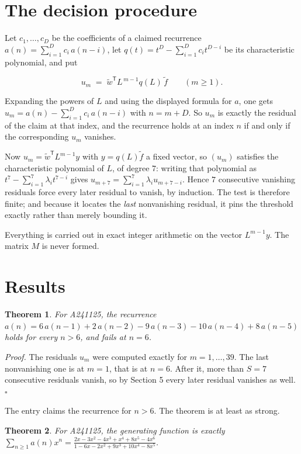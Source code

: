 \documentclass[11pt]{article}
\newtheorem{theorem}{Theorem}
\theoremstyle{definition}
\begin{document}
\section{The decision procedure}

Let $c_1,\dots,c_D$ be the coefficients of a claimed recurrence $a(n) = \sum_{i=1}^{D} c_i\,a(n-i)$, let $q(t) = t^{D} - \sum_{i=1}^{D} c_i t^{D-i}$ be its characteristic polynomial, and put

\[u_m \;=\; \tilde w^{\mathsf T} L^{\,m-1} q(L)\,\tilde f \qquad (m \ge 1).\]

Expanding the powers of $L$ and using the displayed formula for $a$, one gets $u_m = a(n) - \sum_{i=1}^{D} c_i\,a(n-i)$ with $n = m + D$. So $u_m$ is exactly the residual of the claim at that index, and the recurrence holds at an index $n$ if and only if the corresponding $u_m$ vanishes.

Now $u_m = \tilde w^{\mathsf T} L^{m-1} y$ with $y = q(L)\tilde f$ a fixed vector, so $(u_m)$ satisfies the characteristic polynomial of $L$, of degree $7$: writing that polynomial as $t^{7} - \sum_{i=1}^{7} \lambda_i t^{7-i}$ gives $u_{m+7} = \sum_{i=1}^{7} \lambda_i u_{m+7-i}$. Hence $7$ consecutive vanishing residuals force every later residual to vanish, by induction. The test is therefore finite; and because it locates the {\itshape last} nonvanishing residual, it pins the threshold exactly rather than merely bounding it.

Everything is carried out in exact integer arithmetic on the vector $L^{m-1}y$. The matrix $M$ is never formed.

\section{Results}

\begin{theorem} For A241125, the recurrence $a(n) = 6\,a(n-1) + 2\,a(n-2) - 9\,a(n-3) - 10\,a(n-4) + 8\,a(n-5)$ holds for every $n > 6$, and fails at $n = 6$.\end{theorem}

{\itshape Proof.} The residuals $u_m$ were computed exactly for $m = 1,\dots,39$. The last nonvanishing one is at $m = 1$, that is at $n = 6$. After it, more than $S = 7$ consecutive residuals vanish, so by Section 5 every later residual vanishes as well. $\square$

The entry claims the recurrence for $n > 6$. The theorem is at least as strong.

\begin{theorem} For A241125, the generating function is exactly $\sum_{n\ge 1} a(n)x^n = \frac{2x - 3x^{2} - 4x^{3} + x^{4} + 8x^{5} - 4x^{6}}{1 - 6x - 2x^{2} + 9x^{3} + 10x^{4} - 8x^{5}}$.\end{theorem}
\end{document}
